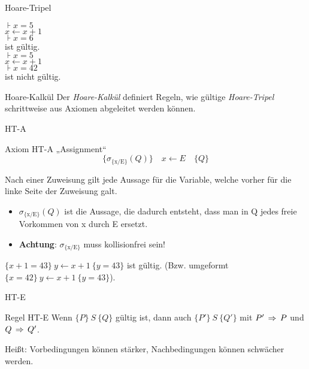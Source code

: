 \begin{frame}{Hoare-Tripel}
	\begin{Beispiel}
		$\assert{x = 5}$ \\
		$x \gets x + 1$ \\
		$\assert{x = 6}$ \\
		ist gültig.  \\
		\medskip
		$\assert{x = 5}$ \\
		$x \gets x + 1$ \\
		$\assert{x = 42}$ \\
		ist nicht gültig.
	\end{Beispiel}
	
	\pause
	\begin{block}{Hoare-Kalkül}
		Der \emph{Hoare-Kalkül} definiert Regeln, wie gültige \emph{Hoare-Tripel} schrittweise aus Axiomen abgeleitet werden können.
	\end{block}
\end{frame}


\begin{frame}{HT-A}
	\begin{block} {Axiom HT-A \quad „Assignment“}
		$$ \{\sigma_{\{\text{x/E}\}} (Q)\} \quad x \leftarrow E \quad \{Q\} $$
	\end{block}
	\pause
	Nach einer Zuweisung gilt jede Aussage für die Variable, welche vorher für die linke Seite der Zuweisung galt.
	\begin{itemize}
		\item $\sigma_{\{\text{x/E}\}} (Q) $ ist die Aussage, die dadurch entsteht, dass man in Q jedes freie Vorkommen von x durch E ersetzt.
		\item \textbf{Achtung}: $\sigma_{\{\text{x/E}\}}$ muss kollisionfrei sein!
	\end{itemize}
	
	\begin{Beispiel}
		$\{ x + 1 = 43\} \ y \gets x + 1\ \{y = 43 \}$ ist gültig. \pause (Bzw. umgeformt \\
		$\{ x = 42 \} \ y \gets x + 1\ \{y = 43 \}$).
	\end{Beispiel}
	
\end{frame}

\begin{frame}{HT-E}
	\begin{block}{Regel HT-E}
		Wenn $\{P\}\ S\ \{Q\}$ gültig ist, dann auch $\{P'\}\ S\ \{Q'\}$ mit $P' \impl P$ und $Q \impl  Q'$.
	\end{block}
	\pause
	Heißt: Vorbedingungen können stärker, Nachbedingungen können schwächer werden.

\end{frame}

